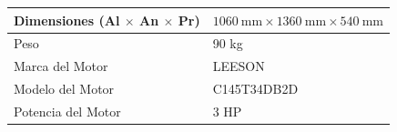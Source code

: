 \begin{ThreePartTable}
\begin{longtable}{@{}P{0.35\textwidth}P{0.60\textwidth}@{}}
        Dimensiones (Al $\times$ An $\times$ Pr) &
            $1060\ \text{mm} \times 1360\ \text{mm} \times 540\ \text{mm}$ \\

        \midrule

        Peso &
            90 kg \\

        \midrule

        Marca del Motor &
            LEESON \\

        \midrule

        Modelo del Motor &
            C145T34DB2D \\

        \midrule

        Potencia del Motor &
            3 HP \\

    \end{longtable}

\end{ThreePartTable}